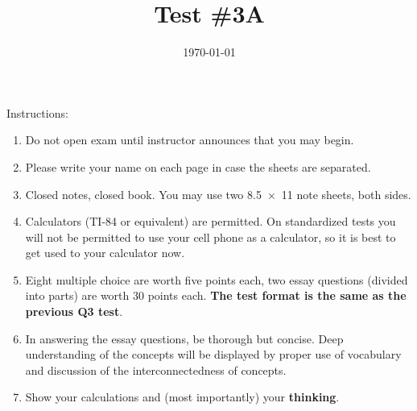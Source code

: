 \documentclass[exam,addpoints, noanswers]{exam}
\title{Test \#3A}
\date{\today}
\author{\mobeardInstructorShort}
\begin{document}
\maketitle
\vfill
\mobeardExamNameBlock
\vfill
Instructions: 
\begin{enumerate}
\item Do not open exam until instructor announces that you may begin.
\item Please write your name on each page in case the sheets are separated. 
\item Closed notes, closed book.  You may use two \SI{8.5x11}{\inch} note sheets, both sides. 
\item Calculators (TI-84 or equivalent) are permitted.  On standardized tests you will not be permitted to use your cell phone as a calculator, so it is best to get used to your calculator now. 
\item Eight multiple choice are worth five points each, two essay questions (divided into parts) are worth 30 points each.  \textbf{The test format is the same as the previous Q3 test}. 
\item In answering the essay questions, be thorough but concise. Deep understanding of the concepts will be displayed by proper use of vocabulary and discussion of the interconnectedness of concepts. 
\item Show your calculations and (most importantly) your \textbf{thinking}.
\end{enumerate}
\vfill
\begin{center}
\gradetable[h][questions]
\end{center}
\clearpage
\end{document}
